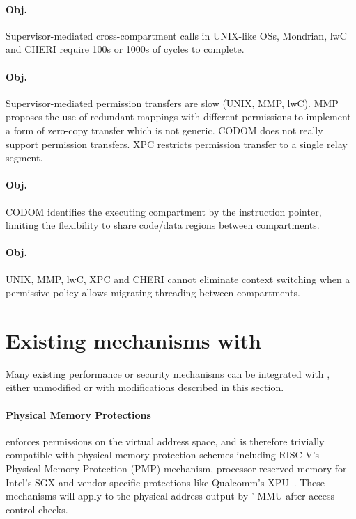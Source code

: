\paragraph{Obj. }
Supervisor-mediated cross-compartment calls in UNIX-like OSs,
Mondrian, lwC and CHERI require 100s or 1000s of cycles to complete.

\paragraph{Obj. }
Supervisor-mediated permission transfers are slow (UNIX, MMP, lwC).
MMP proposes the use of redundant mappings with different permissions
to implement a form of zero-copy transfer which is not generic.
CODOM does not really support permission transfers.
XPC restricts permission transfer to a single relay segment.

\paragraph{Obj. }
CODOM identifies the executing compartment by the instruction pointer, 
limiting the flexibility to share code/data regions between compartments.

\paragraph{Obj. }
UNIX, MMP, lwC, XPC and CHERI cannot eliminate context switching when a
permissive policy allows migrating threading between compartments.

\section{Existing mechanisms with \seccells}
\label{app:integrate_exist}
Many existing performance or security mechanisms can be integrated with
\seccells, either unmodified or with modifications described in this section.

\paragraph{Physical Memory Protections}
\seccells enforces permissions on the virtual address space, and is therefore
trivially compatible with physical memory protection schemes 
including RISC-V's Physical Memory Protection (PMP) mechanism, 
processor reserved memory for Intel's SGX
and vendor-specific protections like Qualcomm's XPU~\cite{qualcomm_ac}.
These mechanisms will apply to the physical address output by 
\seccells' MMU after \ptable access control checks.

